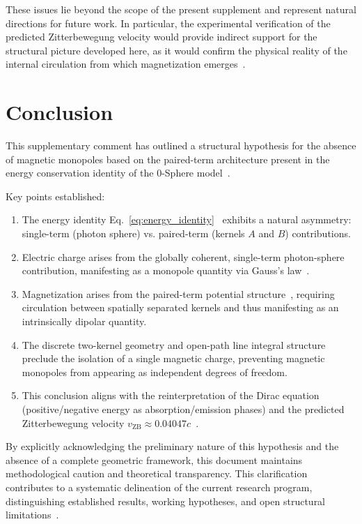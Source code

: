\documentclass[12pt,letterpaper]{article}
\begin{document}
These issues lie beyond the scope of the present supplement and represent natural directions for future work. In particular, the experimental verification of the predicted Zitterbewegung velocity would provide indirect support for the structural picture developed here, as it would confirm the physical reality of the internal circulation from which magnetization emerges~\cite{hanamura18356895}.


\section{Conclusion}

\justifying
This supplementary comment has outlined a structural hypothesis for the absence of magnetic monopoles based on the paired-term architecture present in the energy conservation identity of the 0-Sphere model~\cite{hanamura16759284,hanamura18603340}.

Key points established:
\begin{enumerate}
\item The energy identity Eq.~\eqref{eq:energy_identity}~\cite{hanamura16759284} exhibits a natural asymmetry: single-term (photon sphere) vs. paired-term (kernels $A$ and $B$) contributions.
\item Electric charge arises from the globally coherent, single-term photon-sphere contribution, manifesting as a monopole quantity via Gauss's law~\cite{hanamura18603340}.
\item Magnetization arises from the paired-term potential structure~\cite{hanamura18356895}, requiring circulation between spatially separated kernels and thus manifesting as an intrinsically dipolar quantity.
\item The discrete two-kernel geometry and open-path line integral structure~\cite{hanamura18067760,hanamura18135855,hanamura18203433} preclude the isolation of a single magnetic charge, preventing magnetic monopoles from appearing as independent degrees of freedom.
\item This conclusion aligns with the reinterpretation of the Dirac equation~\cite{hanamura17760132} (positive/negative energy as absorption/emission phases) and the predicted Zitterbewegung velocity $v_{\mathrm{ZB}} \approx 0.04047c$~\cite{hanamura18356895,hanamura17765409}.
\end{enumerate}

By explicitly acknowledging the preliminary nature of this hypothesis and the absence of a complete geometric framework, this document maintains methodological caution and theoretical transparency. This clarification contributes to a systematic delineation of the current research program, distinguishing established results, working hypotheses, and open structural limitations~\cite{hanamura18603340}.
\end{document}
